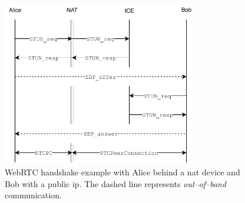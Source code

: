 \begin{figure}
\centering
\includegraphics[width=0.75\textwidth]{graphics/webrtc-handshake.pdf}
\caption{WebRTC handshake example with Alice behind a \gls{nat} device and Bob with a public \gls{ip}. The dashed line represents \textit{out–of–band} communication.}
\label{fig:webrtc-handshake}
\end{figure}

